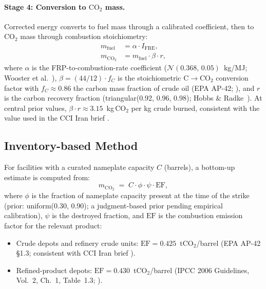 \documentclass[11pt]{article}
\begin{document}
\paragraph{Stage 4: Conversion to $\mathrm{CO_2}$ mass.}
Corrected energy converts to fuel mass through a calibrated coefficient,
then to $\mathrm{CO_2}$ mass through combustion stoichiometry:
\begin{align}
m_{\mathrm{fuel}} &= \alpha \cdot I_{\mathrm{FRE}},
\label{eq:fuel}\\
m_{\mathrm{CO_2}} &= m_{\mathrm{fuel}} \cdot \beta \cdot r,
\label{eq:co2-frp}
\end{align}
where $\alpha$ is the FRP-to-combustion-rate coefficient
($\mathcal{N}(0.368,\,0.05)$~kg/MJ; Wooster et al.~\cite{wooster2005}),
$\beta = (44/12)\cdot f_C$ is the stoichiometric
$\mathrm{C}\!\to\!\mathrm{CO_2}$ conversion factor with $f_C \approx 0.86$
the carbon mass fraction of crude oil (EPA AP-42; \cite{ap42}), and $r$ is
the carbon recovery fraction (triangular(0.92, 0.96, 0.98);
Hobbs \& Radke~\cite{hobbs1992}). At central prior values,
$\beta \cdot r \approx 3.15$~kg$\,\mathrm{CO_2}$ per kg crude burned,
consistent with the value used in the CCI Iran brief
\cite{bigger2026,cci2026}.

\subsection{Inventory-based Method}
\label{sec:inventory}

For facilities with a curated nameplate capacity $C$ (barrels), a
bottom-up estimate is computed from:
\begin{equation}
m_{\mathrm{CO_2}} \;=\; C \cdot \phi \cdot \psi \cdot \mathrm{EF},
\label{eq:co2-inv}
\end{equation}
where $\phi$ is the fraction of nameplate capacity present at the time of
the strike (prior: uniform(0.30, 0.90); a judgment-based prior pending
empirical calibration), $\psi$ is the destroyed fraction, and
$\mathrm{EF}$ is the combustion emission factor for the relevant product:

\begin{itemize}
\item Crude depots and refinery crude units:
  $\mathrm{EF} = 0.425$~tCO$_2$/barrel
  (EPA AP-42 \S1.3; consistent with CCI Iran brief \cite{cci2026}).
\item Refined-product depots:
  $\mathrm{EF} = 0.430$~tCO$_2$/barrel
  (IPCC 2006 Guidelines, Vol.~2, Ch.~1, Table~1.3; \cite{ipcc2006}).
\end{itemize}
\end{document}
